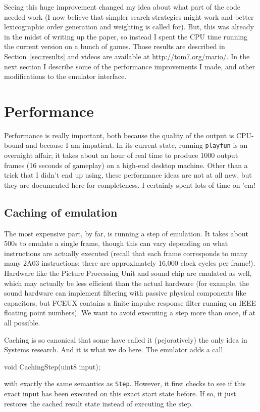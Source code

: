\documentclass[twocolumn]{article}
\begin{document}
Seeing this huge improvement changed my idea about what part of the
code needed work (I now believe that simpler search strategies might
work and better lexicographic order generation and weighting is called
for). But, this was already in the midst of writing up the paper, so
instead I spent the CPU time running the current version on a bunch of
games. Those results are described in Section~\ref{sec:results} and
videos are available at \url{http://tom7.org/mario/}. In the next
section I describe some of the performance improvements I made, and
other modifications to the emulator interface.

\section{Performance} \label{sec:performance}

Performance is really important, both because the quality of the
output is CPU-bound and because I am impatient. In its current state,
running {\tt playfun} is an overnight affair; it takes about an hour
of real time to produce 1000 output frames (16 seconds of gameplay) on
a high-end desktop machine. Other than a trick that I didn't end up
using, these performance ideas are not at all new, but they are
documented here for completeness. I certainly spent lots of time on 'em!

\subsection{Caching of emulation} \label{sec:caching}

The most expensive part, by far, is running a step of emulation. It
takes about 500\textmu s to emulate a single frame, though this can
vary depending on what instructions are actually executed (recall that
each frame corresponds to many many 2A03 instructions; there are
approximately 16,000 clock cycles per frame!). Hardware like the
Picture Processing Unit and sound chip are emulated as well, which may
actually be less efficient than the actual hardware (for example, the
sound hardware can implement filtering with passive physical
components like capacitors, but FCEUX contains a finite impulse
response filter running on IEEE floating point numbers). We want to
avoid executing a step more than once, if at all possible.

Caching is so canonical that some have called it (pejoratively) the
only idea in Systems research. And it is what we do here. The emulator
adds a call
%
\begin{code}
void CachingStep(uint8 input);
\end{code}
%
with exactly the same semantics as {\tt Step}. However, it first
checks to see if this exact input has been executed on this exact
start state before. If so, it just restores the cached result
state instead of executing the step.
\end{document}
